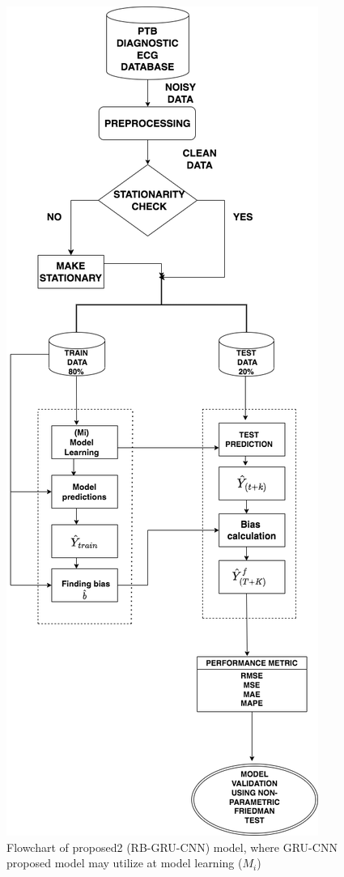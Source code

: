 \documentclass[a4paper, fleqn]{cas-sc}
\begin{document}
  \begin{figure}[h!]
  	\centering
  	\includegraphics[scale=.3]{1.png}
          \caption{Flowchart of proposed2 (RB-GRU-CNN) model,  where GRU-CNN proposed model may utilize at model learning ($M_i$)}
  	\label{Fig:11}
  \end{figure}
\end{document}
